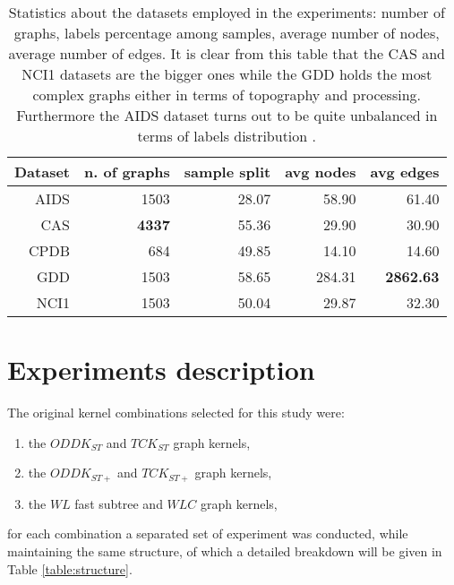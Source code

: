     \begin{table}[ht]
        \centering
        \begin{tabular}{|r|r|r|r|r|}
            \hline
            Dataset & n. of graphs & sample split & avg nodes & avg edges \\ \hline
            AIDS    & 1503         & 28.07        & 58.90     & 61.40     \\ \hline      
            CAS     & \textbf{4337} & 55.36        & 29.90     & 30.90     \\ \hline      
            CPDB    &  684         & 49.85        & 14.10     & 14.60     \\ \hline      
            GDD     & 1503         & 58.65        & 284.31    & \textbf{2862.63}   \\ \hline      
            NCI1    & 1503         & 50.04        & 29.87     & 32.30     \\ \hline      
        \end{tabular}
        \caption{Statistics about the datasets employed in the experiments: number
        of graphs, labels percentage among samples, average number of nodes, average
        number of edges. It is clear from this table that the CAS and NCI1 datasets
        are the bigger ones while the GDD holds the most complex graphs either in
        terms of topography and processing. Furthermore the AIDS dataset turns out
        to be quite unbalanced in terms of labels distribution \cite{rtesselli}.}
        \label{table:datasets}
    \end{table}


\section{Experiments description}
\label{sec:description}

The original kernel combinations selected for this study were:
\begin{enumerate}
    \item the $ODDK_{ST}$ and $TCK_{ST}$ graph kernels,
    \item the $ODDK_{ST+}$ and $TCK_{ST+}$ graph kernels,
    \item the $WL$ fast subtree and $WLC$ graph kernels,
\end{enumerate}

for each combination a separated set of experiment was conducted, while maintaining
the same structure, of which a detailed breakdown will be given in Table \ref{table:structure}.

